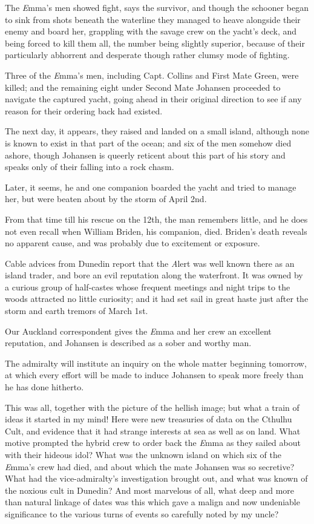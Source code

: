 The {\emph Emma}’s men showed fight, says the survivor, and though the schooner began to sink from shots beneath the waterline they managed to heave alongside their enemy and board her, grappling with the savage crew on the yacht’s deck, and being forced to kill them all, the number being slightly superior, because of their particularly abhorrent and desperate though rather clumsy mode of fighting.

Three of the {\emph Emma}’s men, including Capt. Collins and First Mate Green, were killed; and the remaining eight under Second Mate Johansen proceeded to navigate the captured yacht, going ahead in their original direction to see if any reason for their ordering back had existed.

The next day, it appears, they raised and landed on a small island, although none is known to exist in that part of the ocean; and six of the men somehow died ashore, though Johansen is queerly reticent about this part of his story and speaks only of their falling into a rock chasm.

Later, it seems, he and one companion boarded the yacht and tried to manage her, but were beaten about by the storm of April 2nd.

From that time till his rescue on the 12th, the man remembers little, and he does not even recall when William Briden, his companion, died. Briden’s death reveals no apparent cause, and was probably due to excitement or exposure.

Cable advices from Dunedin report that the {\emph Alert} was well known there as an island trader, and bore an evil reputation along the waterfront. It was owned by a curious group of half-castes whose frequent meetings and night trips to the woods attracted no little curiosity; and it had set sail in great haste just after the storm and earth tremors of March 1st.

Our Auckland correspondent gives the {\emph Emma} and her crew an excellent reputation, and Johansen is described as a sober and worthy man.

The admiralty will institute an inquiry on the whole matter beginning tomorrow, at which every effort will be made to induce Johansen to speak more freely than he has done hitherto.
\endblockquote

This was all, together with the picture of the hellish image; but what a train of ideas it started in my mind! Here were new treasuries of data on the Cthulhu Cult, and evidence that it had strange interests at sea as well as on land. What motive prompted the hybrid crew to order back the {\emph Emma} as they sailed about with their hideous idol? What was the unknown island on which six of the {\emph Emma}’s crew had died, and about which the mate Johansen was so secretive? What had the vice-admiralty’s investigation brought out, and what was known of the noxious cult in Dunedin? And most marvelous of all, what deep and more than natural linkage of dates was this which gave a malign and now undeniable significance to the various turns of events so carefully noted by my uncle?

